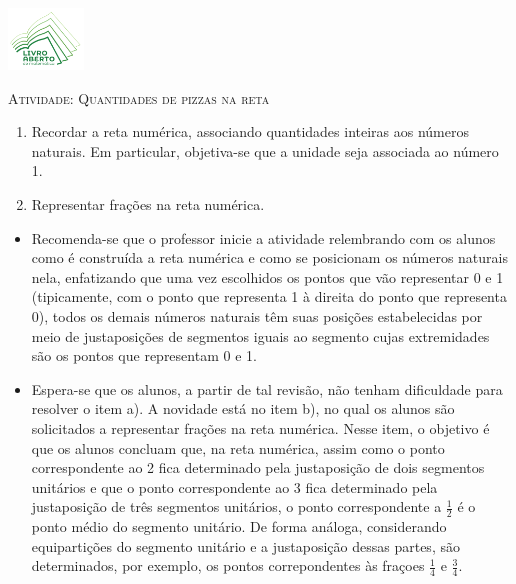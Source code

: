 \documentclass[10 pt,usenames,dvipsnames, oneside]{article}
\begin{document}
\begin{center}
  \begin{minipage}[l]{3cm}
\includegraphics[width=2cm]{../../../Figuras/logo}       
\end{minipage}\hfill
\begin{minipage}[r]{.8\textwidth}
 {\Large \scshape Atividade: Quantidades de pizzas na reta}  
\end{minipage}
\end{center}
\vspace{.2cm}

\ifdefined\prof
\begin{goals}
\begin{enumerate}
    \item Recordar a reta numérica, associando quantidades inteiras aos números naturais. Em particular, objetiva-se que a unidade seja associada ao número 1.
    \item Representar frações na reta numérica.
\end{enumerate}

\tcblower

\begin{itemize}
    \item Recomenda-se que o professor inicie a atividade relembrando com os alunos como é construída a reta numérica e como se posicionam os números naturais nela, enfatizando que uma vez escolhidos os pontos que vão representar 0 e 1 (tipicamente, com o ponto que representa 1 à direita do ponto que representa 0), todos os demais números naturais têm suas posições estabelecidas por meio de justaposições de segmentos iguais ao segmento cujas extremidades são os pontos que representam 0 e 1.
    \item Espera-se que os alunos, a partir de tal revisão, não tenham dificuldade para resolver o item a). A novidade está no item b), no qual os alunos são solicitados a representar frações na reta numérica. Nesse item, o objetivo é que os alunos concluam que, na reta numérica, assim como o ponto correspondente ao 2 fica determinado pela justaposição de dois segmentos unitários e que o ponto correspondente ao 3 fica determinado pela justaposição de três segmentos unitários, o ponto correspondente a $\frac{1}{2}$ é o ponto médio do segmento unitário. De forma análoga, considerando equipartições do segmento unitário e a justaposição dessas partes, são determinados, por exemplo, os pontos correpondentes às fraçoes $\frac{1}{4}$ e $\frac{3}{4}$.
\end{itemize}
\end{goals}
\end{document}
